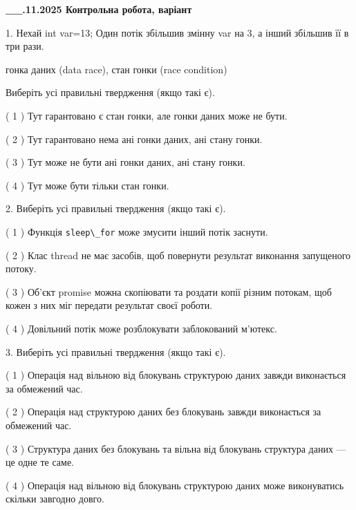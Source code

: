 \documentclass[12pt, ukrainian]{article}
\def\code#1{\Verb!#1!}
\begin{document}
\newpage
\begin {large}

\textbf{\_\_.11.2025 Контрольна робота, варіант  }\par


{
1. Нехай int var=13; Один потік збільшив змінну var на 3, а інший збільшив її в три рази.

гонка даних (data race), стан гонки (race condition)

Виберіть усі правильні твердження (якщо такі є).\par
\vspace{2mm}
( 1 ) Тут гарантовано є стан гонки, але гонки даних може не бути.%

( 2 ) Тут гарантовано нема ані гонки даних, ані стану гонки.%

( 3 ) Тут може не бути ані гонки даних, ані стану гонки.%

( 4 ) Тут може бути тільки стан гонки.%


2. Виберіть усі правильні твердження (якщо такі є).\par
\vspace{2mm}

( 1 ) Функція \code{sleep\_for} може змусити інший потік заснути.%

( 2 ) Клас thread не має засобів, щоб повернути результат виконання запущеного потоку.%

( 3 ) Об’єкт promise можна скопіювати та роздати копії різним потокам, щоб кожен з них міг передати результат своєї роботи.%

( 4 ) Довільний потік може розблокувати заблокований м’ютекс.%


3. Виберіть усі правильні твердження (якщо такі є).\par
\vspace{2mm}

( 1 ) Операція над вільною від блокувань структурою даних завжди виконається за обмежений час.%

( 2 ) Операція над структурою даних без блокувань завжди виконається за обмежений час.%

( 3 ) Структура даних без блокувань та вільна від блокувань структура даних --- це одне те саме.%

( 4 ) Операція над вільною від блокувань структурою даних може виконуватись скільки завгодно довго.%


}
\end{large}
\end{document}

